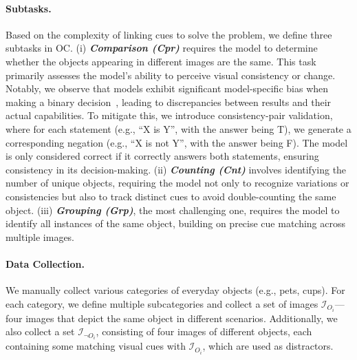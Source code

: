 \paragraph{Subtasks.} 
\label{subtasks}
Based on the complexity of linking cues to solve the problem, we define three subtasks in OC. (i) \textbf{\textit{Comparison (Cpr)}} requires the model to determine whether the objects appearing in different images are the same. This task primarily assesses the model’s ability to perceive visual consistency or change. Notably, we observe that models exhibit significant model-specific bias when making a binary decision~\citep{pair, ye2024justice, song2024large,li2024naturalbench}, leading to discrepancies between results and their actual capabilities. To mitigate this, we introduce consistency-pair validation, where for each statement (e.g., ``X is Y”, with the answer being T), we generate a corresponding negation (e.g., ``X is not Y”, with the answer being F). The model is only considered correct if it correctly answers both statements, ensuring consistency in its decision-making.
(ii) \textbf{\textit{Counting (Cnt)}} involves identifying the number of unique objects, requiring the model not only to recognize variations or consistencies but also to track distinct cues to avoid double-counting the same object. (iii) \textbf{\textit{Grouping (Grp)}}, the most challenging one, requires the model to identify all instances of the same object, building on precise cue matching across multiple images.

\paragraph{Data Collection.}  
We manually collect various categories of everyday objects (e.g., pets, cups). For each category, we define multiple subcategories and collect a set of images \( \mathcal{I}_{O_i}\)—four images that depict the same object in different scenarios. Additionally, we also collect a set \( \mathcal{I}_{\neg O_i} \), consisting of four images of different objects, each containing some matching visual cues with \( \mathcal{I}_{O_i} \), which are used as distractors.


